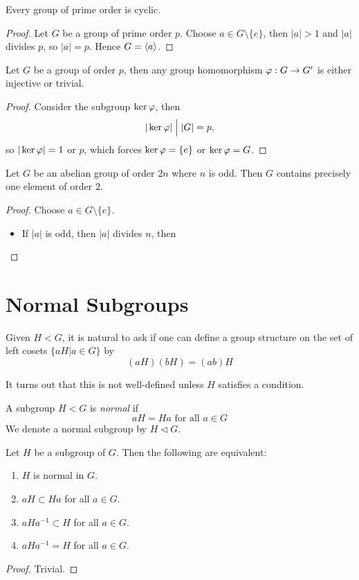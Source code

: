 \begin{corollary}
  Every group of prime order is cyclic.
\end{corollary}
\begin{proof}
  Let \(G\) be a group of prime order \(p\). Choose \(a\in G\setminus\{e\}\), then \(|a| > 1\) and \(|a|\) divides \(p\), so \(|a| = p\). Hence \(G = \langle a\rangle\).
\end{proof}

\begin{exercise}
  Let \(G\) be a group of order \(p\), then any group homomorphism \(\varphi:G\to G'\) is either injective or trivial.
\end{exercise}
\begin{proof}
  Consider the subgroup \(\ker\varphi\), then \[
    |\ker\varphi| \Bigm| |G| = p,
  \] so \(|\ker\varphi| = 1\) or \(p\), which forces \(\ker\varphi = \{e\}\) or \(\ker\varphi = G\).
\end{proof}

\begin{exercise}
  Let \(G\) be an abelian group of order \(2n\) where \(n\) is odd. Then \(G\) contains precisely one element of order \(2\).
\end{exercise}
\begin{proof}
  Choose \(a\in G\setminus\{e\}\).
  \begin{itemize}
    \item If \(|a|\) is odd, then \(|a|\) divides \(n\), then
  \end{itemize}
\end{proof}

\section{Normal Subgroups}

Given \(H < G\), it is natural to ask if one can define a group structure on the set of left cosets \(\{aH | a\in G\}\) by \[
  (aH)(bH) = (ab)H
\]

It turns out that this is not well-defined unless \(H\) satisfies a condition.
\begin{definition}
  A subgroup \(H < G\) is \emph{normal} if \[
    aH = Ha \text{ for all } a\in G
  \]
  We denote a normal subgroup by \(H \lhd G\).
\end{definition}

\begin{proposition}
  Let \(H\) be a subgroup of \(G\). Then the following are equivalent:
  \begin{enumerate}
    \item \(H\) is normal in \(G\).
    \item \(aH \subset Ha\) for all \(a\in G\).
    \item \(aHa^{-1} \subset H\) for all \(a\in G\).
    \item \(aHa^{-1} = H\) for all \(a\in G\).
  \end{enumerate}
\end{proposition}
\begin{proof}
  Trivial.
\end{proof}


